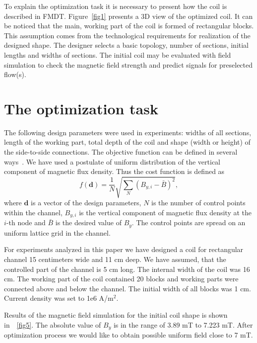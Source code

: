 \documentclass[twocolumn,a4paper]{article}
\def\rref#1{\figurename~\ref{#1}}
\begin{document}
To explain the optimization task it is necessary to present how the coil is described in FMDT. Figure~\ref{fig1} presents a 3D view
of the optimized coil.
It can be noticed that the main, working part of the coil is formed of rectangular blocks. This assumption comes from
the technological requirements for realization of the designed shape. The designer selects a basic topology, number of sections, initial lengths and widths of sections.
The initial coil may be evaluated with field simulation to check the magnetic field strength and predict signals for preselected
flow(s).

\section{The optimization task}


The following design parameters were used in experiments: widths of all sections, length of the working part, total depth of the coil and shape (width or height) of the side-to-side connections. The objective function can be defined in several ways~\cite{IEEEIM2002}. We have used a postulate of uniform distribution of the vertical component of magnetic flux density. Thus the cost function is defined as
\begin{equation}
 f(\mathbf d) = \frac{1}{N}\sqrt{ \sum_N ( B_{y,i} - \bar B )^2 },
\end{equation}
where $\mathbf d$ is a vector of the design parameters, $N$ is the number of control points within the channel, $B_{y,i}$ is the vertical component of  magnetic flux density at the $i$-th node and $\bar B$ is the desired value of $B_y$. The control points are spread on an uniform lattice grid in the channel.

For experiments analyzed in this paper we have designed a coil for rectangular channel 15 centimeters wide and 11 cm deep. We have assumed, that the controlled part of the channel is 5 cm long. The internal width of the coil was 16 cm. The working part of the coil contained 20 blocks and working parts were connected above and below the channel. The initial width of all blocks was 1 cm. Current density was set to 1e6 A/m$^2$.

Results of the magnetic field simulation for the initial coil shape is shown in~\rref{fig5}. The absolute value of $B_y$ is in the range of 3.89 mT to 7.223 mT. After optimization process we would like to obtain possible uniform field close to 7 mT.
\end{document}
